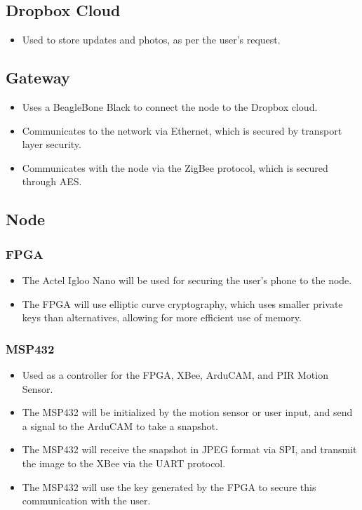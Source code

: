 \documentclass[11pt]{article}
\begin{document}
\subsection{Dropbox Cloud}
\begin{itemize}
\item Used to store updates and photos, as per the user's request.
\end{itemize}

\subsection{Gateway}
\begin{itemize}
\item Uses a BeagleBone Black to connect the node to the Dropbox cloud.
\item Communicates to the network via Ethernet, which is secured by transport layer security.
\item Communicates with the node via the ZigBee protocol, which is secured through AES.
\end{itemize}


\subsection{Node}
\subsubsection{FPGA}
\begin{itemize}
\item The Actel Igloo Nano will be used for securing the user's phone to the node.  
\item The FPGA will use elliptic curve cryptography, which uses smaller private keys than alternatives, allowing for more efficient use of memory.
\end{itemize}


 \subsubsection{MSP432}
 \begin{itemize}
 \item Used as a controller for the FPGA, XBee, ArduCAM, and PIR Motion Sensor.
 \item The MSP432 will be initialized by the motion sensor or user input, and send a signal to the ArduCAM to take a snapshot.
 \item The MSP432 will receive the snapshot in JPEG format via SPI, and transmit the image to the XBee via the UART protocol.
 \item The MSP432 will use the key generated by the FPGA to secure this communication with the user.
 \end{itemize}
 
\end{document}
